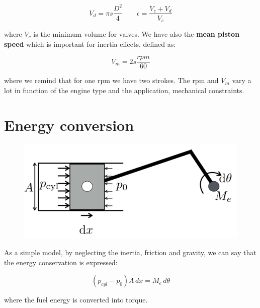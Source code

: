 	\begin{equation}
	V_d = \pi s \frac{D^2}{4}\qquad \epsilon = \frac{V_c + V_d}{V_c}
	\end{equation}
	
	where $V_c$ is the minimum volume for valves. We have also the \textbf{mean piston speed} which is important for inertia effects, defined as:
	
	\begin{equation}
	V_m = 2s\frac{rpm}{60}
	\end{equation}

	where we remind that for one rpm we have two strokes. The rpm and $V_m$ vary a lot in function of the engine type and the application, mechanical constraints. 
	
\section{Energy conversion}
	\begin{figure}
	\vspace{-5mm}
	\includegraphics[scale=0.4]{ch2/9}
	\label{fig:2.9}
	\end{figure}
	As a simple model, by neglecting the inertia, friction and gravity, we can say that the energy conservation is expressed:
	
	\begin{equation}
	(p_{cyl} - p_0) A \, dx = M_e \, d\theta
	\end{equation}
	
	where the fuel energy is converted into torque. 
	
